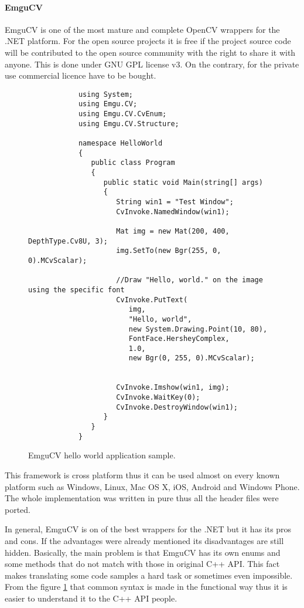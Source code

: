 \documentclass[../../../../main]{subfiles}
\begin{document}
\paragraph{EmguCV}

\ac{EmguCV} is one of the most mature and complete \ac{OpenCV} wrappers for the .NET platform. For the open source projects it is free if the project source code will be contributed to the open source community with the right to share it with anyone. This is done under GNU GPL license v3. On the contrary, for the private use commercial licence have to be bought.

\begin{figure} [!ht]
  \centering    
    \lstset{style=sharpc}
        \begin{lstlisting}
            using System;
            using Emgu.CV;
            using Emgu.CV.CvEnum;
            using Emgu.CV.Structure;
            
            namespace HelloWorld
            {
               public class Program
               {
                  public static void Main(string[] args)
                  {
                     String win1 = "Test Window";
                     CvInvoke.NamedWindow(win1);
            
                     Mat img = new Mat(200, 400, DepthType.Cv8U, 3); 
                     img.SetTo(new Bgr(255, 0, 0).MCvScalar);
            
                     //Draw "Hello, world." on the image using the specific font
                     CvInvoke.PutText(
                        img, 
                        "Hello, world", 
                        new System.Drawing.Point(10, 80), 
                        FontFace.HersheyComplex, 
                        1.0, 
                        new Bgr(0, 255, 0).MCvScalar);
                     
            
                     CvInvoke.Imshow(win1, img); 
                     CvInvoke.WaitKey(0); 
                     CvInvoke.DestroyWindow(win1);
                  }
               }
            }
        \end{lstlisting}
  \caption{EmguCV hello world application sample.}
  \label{emgucvhelloworld}
\end{figure}

This framework is cross platform thus it can be used almost on every known platform such as Windows, Linux, Mac OS X, iOS, Android and Windows Phone. The whole implementation was written in pure {\Csharp} thus all the header files were ported.

In general, \ac{EmguCV} is on of the best wrappers for the .NET but it has its pros and cons. If the advantages were already mentioned its disadvantages are still hidden. Basically, the main problem is that \ac{EmguCV} has its own enums and some methods that do not match with those in original C++ \ac{API}. This fact makes translating some code samples a hard task or sometimes even impossible. From the figure \ref{emgucvhelloworld} that common syntax is made in the functional way thus it is easier to understand it to the C++ \ac{API} people.
\end{document}
